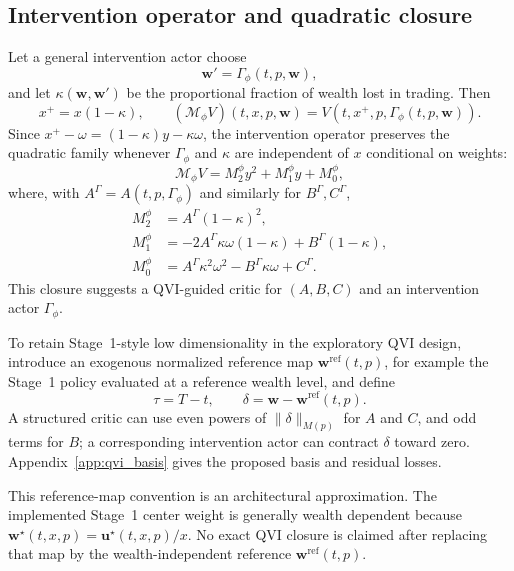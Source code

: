 \documentclass[a4paper,10pt]{article}
\newcommand{\bu}{\bm{u}}
\newcommand{\bw}{\bm{w}}
\begin{document}
\subsection{Intervention operator and quadratic closure}

Let a general intervention actor choose
\begin{equation}
\bw'=\Gamma_\phi(t,p,\bw),
\end{equation}
and let $\kappa(\bw,\bw')$ be the proportional fraction of wealth lost in trading. Then
\begin{equation}
x^+=x(1-\kappa),
\qquad
(\mathcal M_\phi V)(t,x,p,\bw)
=V(t,x^+,p,\Gamma_\phi(t,p,\bw)).
\end{equation}
Since $x^+-\omega=(1-\kappa)y-\kappa\omega$, the intervention operator preserves the quadratic family whenever $\Gamma_\phi$ and $\kappa$ are independent of $x$ conditional on weights:
\begin{equation}
\mathcal M_\phi V
=M_2^\phi y^2+M_1^\phi y+M_0^\phi,
\end{equation}
where, with $A^\Gamma=A(t,p,\Gamma_\phi)$ and similarly for $B^\Gamma,C^\Gamma$,
\begin{align}
M_2^\phi&=A^\Gamma(1-\kappa)^2,\\
M_1^\phi&=-2A^\Gamma\kappa\omega(1-\kappa)+B^\Gamma(1-\kappa),\\
M_0^\phi&=A^\Gamma\kappa^2\omega^2-B^\Gamma\kappa\omega+C^\Gamma.
\label{eq:intervention_coefficients}
\end{align}
This closure suggests a QVI-guided critic for $(A,B,C)$ and an intervention actor $\Gamma_\phi$.

To retain Stage~1-style low dimensionality in the exploratory QVI design, introduce an exogenous normalized reference map $\bw^{\mathrm{ref}}(t,p)$, for example the Stage~1 policy evaluated at a reference wealth level, and define
\begin{equation}
\tau=T-t,\qquad
\delta=\bw-\bw^{\mathrm{ref}}(t,p).
\end{equation}
A structured critic can use even powers of $\|\delta\|_{M(p)}$ for $A$ and $C$, and odd terms for $B$; a corresponding intervention actor can contract $\delta$ toward zero. Appendix~\ref{app:qvi_basis} gives the proposed basis and residual losses.

This reference-map convention is an architectural approximation. The implemented Stage~1 center weight is generally wealth dependent because $\bw^\star(t,x,p)=\bu^\star(t,x,p)/x$. No exact QVI closure is claimed after replacing that map by the wealth-independent reference $\bw^{\mathrm{ref}}(t,p)$.
\end{document}
